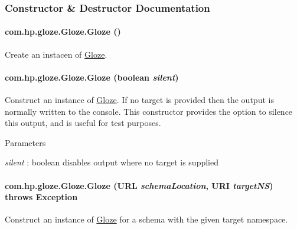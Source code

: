 \subsubsection{Constructor \& Destructor Documentation}
\hypertarget{classcom_1_1hp_1_1gloze_1_1_gloze_a1baa43e23eabc27283a8d41041e23b50}{
\paragraph[{Gloze}]{\setlength{\rightskip}{0pt plus 5cm}com.hp.gloze.Gloze.Gloze ()}\hfill}
\label{classcom_1_1hp_1_1gloze_1_1_gloze_a1baa43e23eabc27283a8d41041e23b50}
Create an instacen of \hyperlink{classcom_1_1hp_1_1gloze_1_1_gloze}{Gloze}. \hypertarget{classcom_1_1hp_1_1gloze_1_1_gloze_a7ad809006ee768f2938aabf10efe9f26}{
\paragraph[{Gloze}]{\setlength{\rightskip}{0pt plus 5cm}com.hp.gloze.Gloze.Gloze (boolean {\em silent})}\hfill}
\label{classcom_1_1hp_1_1gloze_1_1_gloze_a7ad809006ee768f2938aabf10efe9f26}
Construct an instance of \hyperlink{classcom_1_1hp_1_1gloze_1_1_gloze}{Gloze}. If no target is provided then the output is normally written to the console. This constructor provides the option to silence this output, and is useful for test purposes. 
\begin{DoxyParams}{Parameters}
\item[{\em silent}]: boolean disables output where no target is supplied \end{DoxyParams}
\hypertarget{classcom_1_1hp_1_1gloze_1_1_gloze_ad81afee66006cc4229a75296ce365aa8}{
\paragraph[{Gloze}]{\setlength{\rightskip}{0pt plus 5cm}com.hp.gloze.Gloze.Gloze (URL {\em schemaLocation}, \/  URI {\em targetNS})  throws Exception }\hfill}
\label{classcom_1_1hp_1_1gloze_1_1_gloze_ad81afee66006cc4229a75296ce365aa8}
Construct an instance of \hyperlink{classcom_1_1hp_1_1gloze_1_1_gloze}{Gloze} for a schema with the given target namespace.


